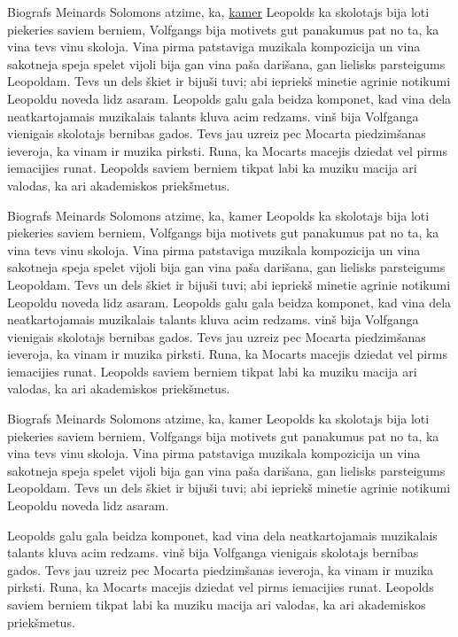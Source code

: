 \documentclass[a4paper]{article}
\begin{document}
Biografs Meinards Solomons atzime, ka, \underline{kamer} Leopolds ka skolotajs bija loti piekeries saviem berniem, Volfgangs bija motivets gut panakumus pat no ta, ka vina tevs vinu skoloja. Vina pirma patstaviga muzikala kompozicija un vina sakotneja speja spelet vijoli bija gan vina paša darišana, gan lielisks parsteigums Leopoldam. Tevs un dels škiet ir bijuši tuvi; abi iepriekš minetie agrinie notikumi Leopoldu noveda lidz asaram.
Leopolds galu gala beidza komponet, kad vina dela neatkartojamais muzikalais talants kluva acim redzams. vinš bija Volfganga vienigais skolotajs bernibas gados. Tevs jau uzreiz pec Mocarta piedzimšanas ieveroja, ka vinam ir muzika pirksti. Runa, ka Mocarts macejis dziedat vel pirms iemacijies runat. Leopolds saviem berniem tikpat labi ka muziku macija ari valodas, ka ari akademiskos priekšmetus.

Biografs Meinards Solomons atzime, ka, kamer Leopolds ka skolotajs bija loti piekeries saviem berniem, Volfgangs bija motivets gut panakumus pat no ta, ka vina tevs vinu skoloja. Vina pirma patstaviga muzikala kompozicija un vina sakotneja speja spelet vijoli bija gan vina paša darišana, gan lielisks parsteigums Leopoldam. Tevs un dels škiet ir bijuši tuvi; abi iepriekš minetie agrinie notikumi Leopoldu noveda lidz asaram.
Leopolds galu gala beidza komponet, kad vina dela neatkartojamais muzikalais talants kluva acim redzams. vinš bija Volfganga vienigais skolotajs bernibas gados. Tevs jau uzreiz pec Mocarta piedzimšanas ieveroja, ka vinam ir muzika pirksti. Runa, ka Mocarts macejis dziedat vel pirms iemacijies runat. Leopolds saviem berniem tikpat labi ka muziku macija ari valodas, ka ari akademiskos priekšmetus.

Biografs Meinards Solomons atzime, ka, kamer Leopolds ka skolotajs bija loti piekeries saviem berniem, Volfgangs bija motivets gut panakumus pat no ta, ka vina tevs vinu skoloja. Vina pirma patstaviga muzikala kompozicija un vina sakotneja speja spelet vijoli bija gan vina paša darišana, gan lielisks parsteigums Leopoldam. Tevs un dels škiet ir bijuši tuvi; abi iepriekš minetie agrinie notikumi Leopoldu noveda lidz asaram.

Leopolds galu gala beidza komponet, kad vina dela neatkartojamais muzikalais talants kluva acim redzams. vinš bija Volfganga vienigais skolotajs bernibas gados. Tevs jau uzreiz pec Mocarta piedzimšanas ieveroja, ka vinam ir muzika pirksti. Runa, ka Mocarts macejis dziedat vel pirms iemacijies runat. Leopolds saviem berniem tikpat labi ka muziku macija ari valodas, ka ari akademiskos priekšmetus.\\
\end{document}
